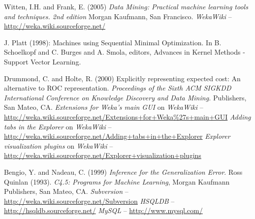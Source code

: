 
\begin{thebibliography}{999}

		Witten, I.H. and Frank, E. (2005) \textit{Data Mining: Practical machine
		learning tools and techniques. 2nd edition}  Morgan Kaufmann, San
		Francisco.
		\textit{WekaWiki} -- \url{http://weka.wiki.sourceforge.net/}{}

		J. Platt (1998): Machines using Sequential Minimal Optimization. In B. Schoelkopf and C. Burges and A. Smola, editors, Advances in Kernel Methods - Support Vector Learning.

		Drummond, C. and Holte, R. (2000) Explicitly representing expected cost: An alternative to ROC representation.
		\textit{Proceedings of the Sixth ACM SIGKDD International Conference on Knowledge Discovery and Data Mining.}
		Publishers, San Mateo, CA.
		\textit{Extensions for Weka's main GUI} on \textit{WekaWiki} -- \\
		\small{\url{http://weka.wiki.sourceforge.net/Extensions+for+Weka\%27s+main+GUI}{}}
		\textit{Adding tabs in the Explorer} on \textit{WekaWiki} -- \\
		\small{\url{http://weka.wiki.sourceforge.net/Adding+tabs+in+the+Explorer}{}}
		\textit{Explorer visualization plugins} on \textit{WekaWiki} -- \\
		\small{\url{http://weka.wiki.sourceforge.net/Explorer+visualization+plugins}{}}

		Bengio, Y. and Nadeau, C. (1999) \textit{Inference for the Generalization Error}.
		Ross Quinlan (1993). \textit{C4.5: Programs for Machine Learning}, Morgan Kaufmann Publishers, San Mateo, CA.
		\textit{Subversion} -- \url{http://weka.wiki.sourceforge.net/Subversion}{}
		\textit{HSQLDB} -- \url{http://hsqldb.sourceforge.net/}{}
		\textit{MySQL} -- \url{http://www.mysql.com/}{}


\end{thebibliography}
